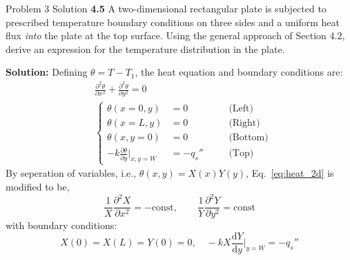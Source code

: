 \documentclass[9pt, aspectratio=169, handout]{beamer}
\begin{document}
\begin{frame}[allowframebreaks]{Problem 3 Solution}
    \textbf{4.5} A two-dimensional rectangular plate is subjected to prescribed temperature boundary conditions on three sides and a uniform heat flux \textit{into} the plate at the top surface. Using the general approach of Section 4.2, derive an expression for the temperature distribution in the plate.

    \vspace{2ex}
    \textbf{Solution:}
    Defining $\theta = T - T_1$, the heat equation and boundary conditions are:
    \begin{subequations}
        \begin{align}
            & \frac{\partial^2 \theta}{\partial x^2} + \frac{\partial^2 \theta}{\partial y^2} = 0 \label{eq:heat_2d}\\
            &\left\{ 
                \begin{alignedat}{2}
                    \theta (x=0, y) &= 0 &\quad &\text{(Left)} \\
                    \theta (x=L, y) &= 0 &\quad &\text{(Right)} \\
                    \theta (x, y=0) &= 0 &\quad &\text{(Bottom)} \\
                    -k\frac{\partial \theta}{\partial y}\Big|_{x, y=W} &= -q_s'' &\quad &\text{(Top)}
                \end{alignedat}
            \right.
        \end{align}
    \end{subequations}
    By seperation of variables, i.e., $\theta(x, y) = X(x)Y(y)$, Eq.~\eqref{eq:heat_2d} is modified to be,
    \begin{equation*}
        \frac{1}{X}\frac{\partial^2 X}{\partial x^2} = -\text{const}, \qquad
        \frac{1}{Y}\frac{\partial^2 Y}{\partial y^2} = \text{const}
    \end{equation*}
    with boundary conditions:
    \begin{equation*}
        X(0) = X(L) = Y(0) = 0, \quad -k X \frac{\mathrm{d} Y}{\mathrm{d} y}\Big|_{y=W} = -q_s''
    \end{equation*}

    \framebreak


\end{frame}
\end{document}

